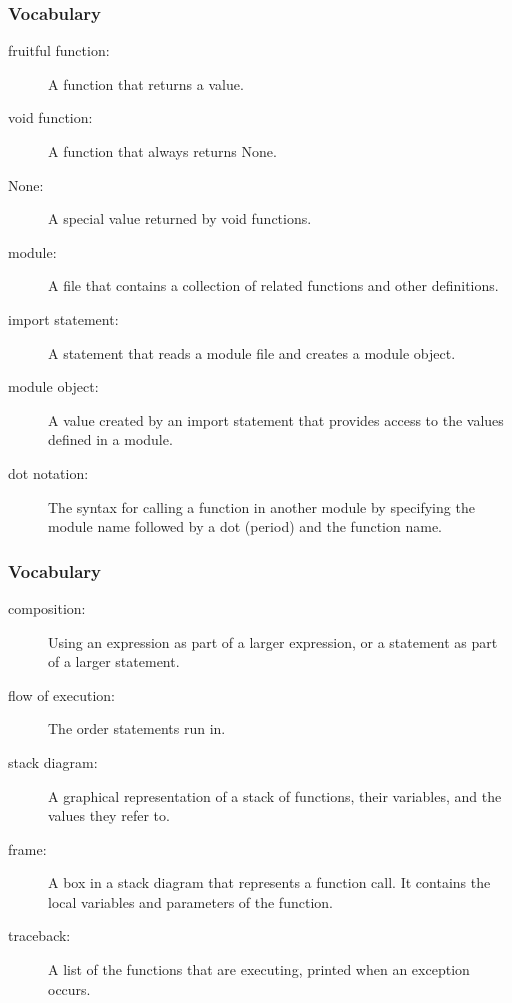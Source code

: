 \documentclass{beamer}
\newcommand{\li}{\item}
\newcommand{\bfr}[1]{\begin{frame}[fragile]\frametitle{{ #1 }}}
\begin{document}
\bfr{Vocabulary}
\begin{description}
\li[fruitful function:]
A function that returns a value.
\li[void function:]
A function that always returns None.
\li[None:]
A special value returned by void functions.
\li[module:]
A file that contains a collection of related functions and other definitions.
\li[import statement:]
A statement that reads a module file and creates a module object.
\li[module object:]
A value created by an import statement that provides access to the values defined in a module.
\li[dot notation:]
The syntax for calling a function in another module by specifying the module name followed by a dot (period) and the function name.
\end{description}
\end{frame}

\bfr{Vocabulary}
\begin{description}
\li[composition:]
Using an expression as part of a larger expression, or a statement as part of a larger statement.
\li[flow of execution:]
The order statements run in.
\li[stack diagram:]
A graphical representation of a stack of functions, their variables, and the values they refer to.
\li[frame:]
A box in a stack diagram that represents a function call. It contains the local variables and parameters of the function.
\li[traceback:]
A list of the functions that are executing, printed when an exception occurs.
\end{description}
\end{frame}
\end{document}

